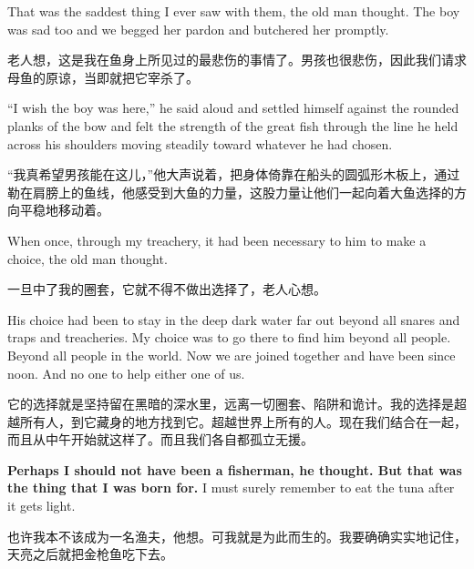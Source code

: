 \begin{paracol}{2}
\switchcolumn*


That was the saddest thing I ever saw with them, the old man thought. The
boy was sad too and we begged her pardon and butchered her \gls{promptly}.

\switchcolumn

老人想，这是我在鱼身上所见过的最悲伤的事情了。男孩也很悲伤，因此我们请求母鱼的原谅，当即就把它宰杀了。

\switchcolumn*

``I wish the boy was here,'' he said aloud and \gls{settled} himself against
the rounded planks of the bow and felt the strength of the great fish
through the line he held across his shoulders moving steadily toward
whatever he had chosen.

\switchcolumn

“我真希望男孩能在这儿，”他大声说着，把身体倚靠在船头的圆弧形木板上，通过勒在肩膀上的鱼线，他感受到大鱼的力量，这股力量让他们一起向着大鱼选择的方向平稳地移动着。

\switchcolumn*

When once, through my \gls{treachery}, it had been necessary to him to make a
choice, the old man thought.

\switchcolumn

一旦中了我的圈套，它就不得不做出选择了，老人心想。

\switchcolumn*

His choice had been to stay in the deep dark water far out \gls{beyond} all
\glspl{snare} and \glspl{trap} and treacheries. My choice was to go
there to find him beyond all people. Beyond all people in the world. Now we
are joined together and have been since noon. And no one to help \gls{either} one
of us.

\switchcolumn

它的选择就是坚持留在黑暗的深水里，远离一切圈套、陷阱和诡计。我的选择是超越所有人，到它藏身的地方找到它。超越世界上所有的人。现在我们结合在一起，而且从中午开始就这样了。而且我们各自都孤立无援。

\switchcolumn*

\textbf{Perhaps I should not have been a fisherman, he thought. But that was the
thing that I was born for.} I must surely remember to eat the tuna after it
gets light.

\switchcolumn

也许我本不该成为一名渔夫，他想。可我就是为此而生的。我要确确实实地记住，天亮之后就把金枪鱼吃下去。

\switchcolumn*


\end{paracol}
